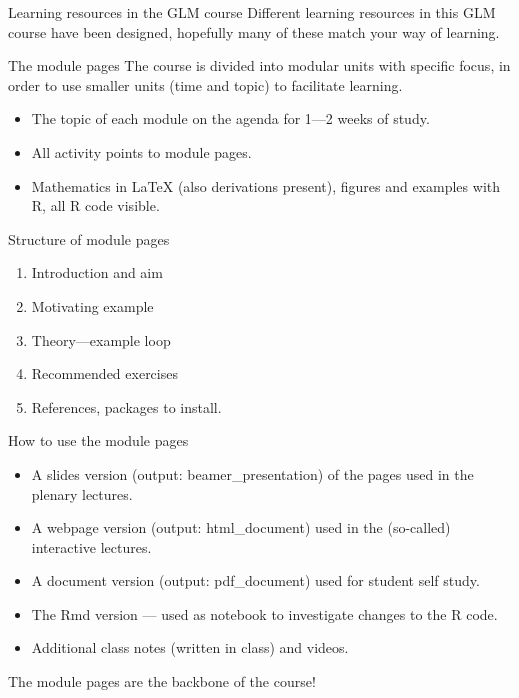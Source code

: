 \documentclass[
  ignorenonframetext,
]{beamer}
\providecommand{\tightlist}{%
  \setlength{\itemsep}{0pt}\setlength{\parskip}{0pt}}
\begin{document}
\begin{frame}{Learning resources in the GLM course}
\label{learning-resources-in-the-glm-course}
Different learning resources in this GLM course have been designed,
hopefully many of these match your way of learning.

\begin{block}{The module pages}
\label{the-module-pages}
The course is divided into modular units with specific focus, in order
to use smaller units (time and topic) to facilitate learning.

\begin{itemize}
\tightlist
\item
  The topic of each module on the agenda for 1---2 weeks of study.
\item
  All activity points to module pages.
\item
  Mathematics in LaTeX (also derivations present), figures and examples
  with R, all R code visible.
\end{itemize}
\end{block}
\end{frame}

\begin{frame}
\begin{block}{Structure of module pages}
\label{structure-of-module-pages}
\begin{enumerate}
[1)]
\tightlist
\item
  Introduction and aim
\item
  Motivating example
\item
  Theory---example loop
\item
  Recommended exercises
\item
  References, packages to install.
\end{enumerate}
\end{block}
\end{frame}

\begin{frame}
\begin{block}{How to use the module pages}
\label{how-to-use-the-module-pages}
\begin{itemize}
\tightlist
\item
  A slides version (output: beamer\_presentation) of the pages used in
  the plenary lectures.
\item
  A webpage version (output: html\_document) used in the (so-called)
  interactive lectures.
\item
  A document version (output: pdf\_document) used for student self
  study.
\item
  The Rmd version --- used as notebook to investigate changes to the R
  code.
\item
  Additional class notes (written in class) and videos.
\end{itemize}

The module pages are the backbone of the course!
\end{block}
\end{frame}
\end{document}
